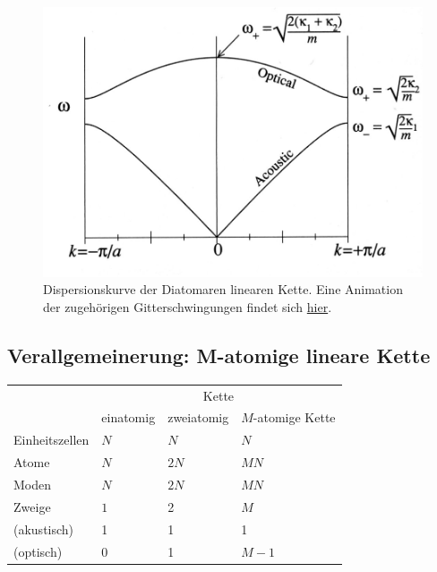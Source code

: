 \documentclass[bfvec]{summery_5.0}
\begin{document}
\begin{figure}[H]
    \centering
    \includegraphics[width=.6\textwidth]{zweige.png}
    \caption{Dispersionskurve der Diatomaren linearen Kette. Eine Animation der zugehörigen Gitterschwingungen findet sich \href{file:./Diatomic_chain.gif}{hier}.}
\end{figure}



\subsection{Verallgemeinerung: M-atomige lineare Kette}
\begin{table}[H]
\centering
\begin{tabular}{@{}llll@{}}
    \toprule
    & \multicolumn{3}{c}{Kette} \\\cmidrule(lr){2-4}
    &einatomig & zweiatomig & $M$-atomige Kette \\
    \midrule
    Einheitszellen & $N$ & $N$ & $N$ \\
    Atome & $N$ & $2N$ & $MN$ \\
    Moden & $N$ & $2N$ & $MN$ \\
    Zweige & $1$ & 2 & $M$ \\
    (akustisch) & 1 & 1 & 1 \\
    (optisch) & 0 & 1 & $M-1$ \\
    \bottomrule
\end{tabular}
\end{table}
\end{document}
